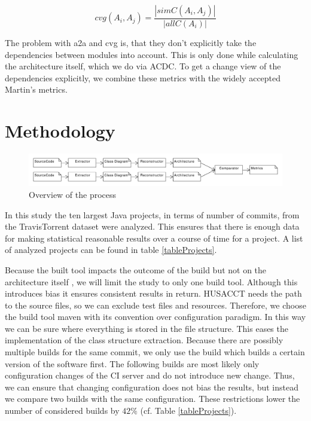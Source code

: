 \documentclass[conference]{IEEEtran}
\begin{document}
\begin{equation} \label{eq:cvg}
cvg(A_i, A_j) = \frac{|simC(A_i, A_j)|}{|allC(A_i)|}
\end{equation}

The problem with a2a and cvg is, that they don't explicitly take the dependencies between modules into account. This is only done while calculating the architecture itself, which we do via ACDC. 
To get a change view of the dependencies explicitly, we combine these metrics with the widely accepted Martin's metrics.

\section{Methodology}

\begin{figure}[!t]
	\centering
	\includegraphics[width=7in]{assets/overview.pdf}
	\caption{Overview of the process}
	\label{overview}
\end{figure}



In this study the ten largest Java projects, in terms of number of commits, from the TravisTorrent dataset were analyzed. This ensures that there is enough data for making statistical reasonable results over a course of time for a project. A list of analyzed projects can be found in table \ref{tableProjects}.

Because the built tool impacts the outcome of the build but not on the architecture itself \cite{FailsCorr}, we will limit the study to only one build tool. Although this introduces bias it ensures consistent results in return. HUSACCT needs the path to the source files, so we can exclude test files and resources. Therefore, we choose the build tool maven  with its convention over configuration paradigm. In this way we can be sure where everything is stored in the file structure. This eases the implementation of the class structure extraction. 
Because there are possibly multiple builds for the same commit, we only use the build which builds a certain version of the software first. The following builds are most likely only configuration changes of the CI server and do not introduce new change. Thus, we can ensure that changing configuration does not bias the results, but instead we compare two builds with the same configuration. These restrictions lower the number of considered builds by $42\%$ (cf. Table \ref{tableProjects}). 
\end{document}
